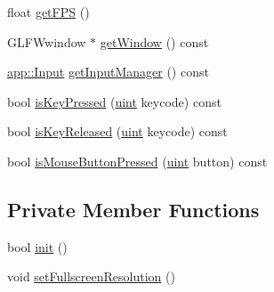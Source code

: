 \begin{DoxyCompactItemize}
\item 
float \hyperlink{classspork_1_1graphics_1_1_window_a3dd5bffe1be30fc323767a7c1bfae23e}{get\+F\+PS} ()
\item 
G\+L\+F\+Wwindow $\ast$ \hyperlink{classspork_1_1graphics_1_1_window_a56276c9d76c6e05876f427009a877228}{get\+Window} () const
\item 
\hyperlink{classspork_1_1app_1_1_input}{app\+::\+Input} \hyperlink{classspork_1_1graphics_1_1_window_a916d4311a1fa1f5350685ec8adf593d4}{get\+Input\+Manager} () const
\item 
bool \hyperlink{classspork_1_1graphics_1_1_window_af7af1e7167d29623fc59d50eae81f261}{is\+Key\+Pressed} (\hyperlink{defines_8h_a91ad9478d81a7aaf2593e8d9c3d06a14}{uint} keycode) const
\item 
bool \hyperlink{classspork_1_1graphics_1_1_window_abe7de27c77151d5d03d07887bb2d6586}{is\+Key\+Released} (\hyperlink{defines_8h_a91ad9478d81a7aaf2593e8d9c3d06a14}{uint} keycode) const
\item 
bool \hyperlink{classspork_1_1graphics_1_1_window_af7792201e6a0bfb8d14758b33f6468b7}{is\+Mouse\+Button\+Pressed} (\hyperlink{defines_8h_a91ad9478d81a7aaf2593e8d9c3d06a14}{uint} button) const
\end{DoxyCompactItemize}
\subsection*{Private Member Functions}
\begin{DoxyCompactItemize}
\item 
bool \hyperlink{classspork_1_1graphics_1_1_window_a63b502f0b800a9e7822fae1d85e0c162}{init} ()
\item 
void \hyperlink{classspork_1_1graphics_1_1_window_a14bd0e3d68dab8d84f0a116ab282a96d}{set\+Fullscreen\+Resolution} ()
\end{DoxyCompactItemize}
